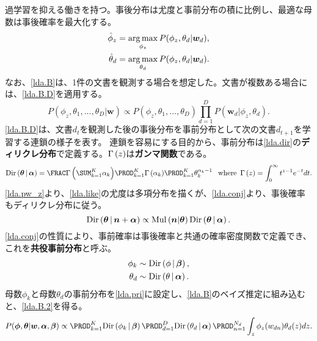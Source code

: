 \documentclass[10pt,a4paper]{book}
\begin{document}
過学習を抑える働きを持つ。事後分布は尤度と事前分布の積に比例し、最適な母数は事後確率を最大化する。
%
\begin{equation}
\begin{aligned}
\hat{\phi}_z &= \operatorname*{arg\,max}_{\phi_z} P(\phi_z,\theta_d|\bm{w}_d),\\
\hat{\theta}_d &= \operatorname*{arg\,max}_{\theta_d} P(\phi_z,\theta_d|\bm{w}_d).
\end{aligned}
\end{equation}
%
なお、\eqref{lda.B}は、1件の文書を観測する場合を想定した。文書が複数ある場合には、\eqref{lda.B.D}を適用する。
%
\begin{equation}
\label{eq:lda.B.D}
P(\phi_z,\theta_1,...,\theta_D|\bm{w}) \propto P(\phi_z,\theta_1,...,\theta_D) \prod_{d=1}^D P(\bm{w}_d|\phi_z,\theta_d).
\end{equation}
%
\eqref{lda.B.D}は、文書$d_t$を観測した後の事後分布を事前分布として次の文書$d_{t+1}$を学習する連鎖の様子を表す。
連鎖を容易にする目的から、事前分布は\eqref{lda.dir}の\textbf{ディリクレ分布}で定義する。$\Gamma\left(z\right)$は\textbf{ガンマ関数}である。
%
\begin{equation}
\label{eq:lda.dir}
\Dd{\bm{\theta}}{\bm{\alpha}} = \frac{\Gd{\sum_{k=1}^K \alpha_k}}{\prod_{k=1}^K \Gd{\alpha_k}} \prod_{k=1}^K \theta_k^{\alpha_k-1}\;
\where \Gd{z} = \int_0^\infty t^{z-1} e^{-t} dt.
\end{equation}
%
\eqref{lda.pw_z}より、\eqref{lda.like}の尤度は多項分布を描くが、\eqref{lda.conj}より、事後確率もディリクレ分布に従う。
%
\begin{equation}
\label{eq:lda.conj}
\mathrm{Dir}\left(\bm{\theta}\,\middle|\,\bm{n}+\bm{\alpha}\right) \propto \mathrm{Mul}\left(\bm{n}|\bm{\theta}\right) \mathrm{Dir}\left(\bm{\theta}\,\middle|\,\bm{\alpha}\right).
\end{equation}
%
\eqref{lda.conj}の性質により、事前確率は事後確率と共通の確率密度関数で定義でき、これを\textbf{共役事前分布}と呼ぶ。
%
\begin{equation}
\label{eq:lda.pri}
\begin{aligned}
\phi_k & \sim \mathrm{Dir}\left(\phi\,\middle|\,\bm{\beta}\right),\\
\theta_d & \sim \mathrm{Dir}\left(\theta\,\middle|\,\bm{\alpha}\right).
\end{aligned}
\end{equation}
%
母数$\phi_k$と母数$\theta_d$の事前分布を\eqref{lda.pri}に設定し、\eqref{lda.B}のベイズ推定に組み込むと、\eqref{lda.B.2}を得る。
%
\begin{equation}
\label{eq:lda.B.2}
P(\bm{\phi},\bm{\theta}|\bm{w},\bm{\alpha},\bm{\beta})
\propto
\prod_{k=1}^K \Dd{\phi_k}{\bm{\beta}}
\prod_{d=1}^D \Dd{\theta_d}{\bm{\alpha}}
\prod_{n=1}^{N_d} \int_z \phi_z(w_{dn}) \theta_d(z) dz.
\end{equation}
\end{document}
